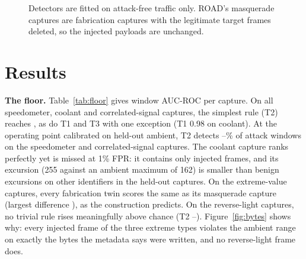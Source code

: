 \documentclass[conference]{IEEEtran}
\newcommand{\Tone}{T1}\newcommand{\Ttwo}{T2}\newcommand{\Tthree}{T3}\newcommand{\Tfour}{T4}
\begin{document}
\begin{figure}[t]
\centering
{}
\caption{Detectors are fitted on attack-free traffic only. ROAD's masquerade captures are fabrication captures with the legitimate target frames deleted, so the injected payloads are unchanged.}
\label{fig:method}
\end{figure}

\section{Results}
\label{sec:results}
\textbf{The floor.} Table~\ref{tab:floor} gives window AUC-ROC per capture. On all \NExtCaps{} speedometer, coolant and correlated-signal captures, the simplest rule (\Ttwo) reaches \ExtAUCmin{}, as do \Tone{} and \Tthree{} with one exception (\Tone{} 0.98 on coolant). At the operating point calibrated on held-out ambient, \Ttwo{} detects \SCTPRmin--\SCTPRmax\% of attack windows on the speedometer and correlated-signal captures. The coolant capture ranks perfectly yet is missed at 1\% FPR: it contains only \CoolantNinj{} injected frames, and its excursion (255 against an ambient maximum of 162) is smaller than benign excursions on other identifiers in the held-out captures. On the extreme-value captures, every fabrication twin scores the same as its masquerade capture (largest difference \FabMasqMaxDiffExt), as the construction predicts. On the \NRlCaps{} reverse-light captures, no trivial rule rises meaningfully above chance (\Ttwo{} \RlAUCmin--\RlAUCmax). Figure~\ref{fig:bytes} shows why: every injected frame of the three extreme types violates the ambient range on exactly the bytes the metadata says were written, and no reverse-light frame does.
\end{document}
